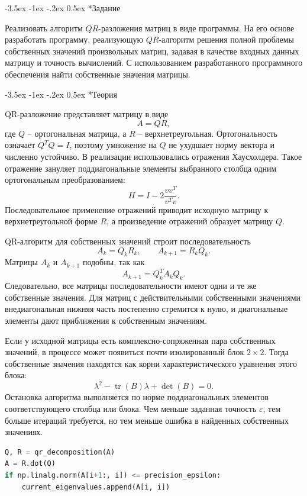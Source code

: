\documentclass[14pt, a4paper]{article}
\makeatletter
\renewcommand\section{\@startsection {section}{1}{\parindent}%
  {-3.5ex \@plus -1ex \@minus -.2ex}%
  {0.5ex}%
  {\normalfont\Large\bfseries}}
\makeatother
\begin{document}
\section*{Задание}
Реализовать алгоритм $QR$-разложения матриц в виде программы. На его основе разработать программу, реализующую $QR$-алгоритм решения полной проблемы собственных значений произвольных матриц, задавая в качестве входных данных матрицу и точность вычислений. С использованием разработанного программного обеспечения найти собственные значения матрицы.

\section*{Теория}
QR-разложение представляет матрицу в виде
\[
    A=QR,
\]
где $Q$ -- ортогональная матрица, а $R$ -- верхнетреугольная. Ортогональность означает $Q^TQ=I$, поэтому умножение на $Q$ не ухудшает норму вектора и численно устойчиво. В реализации использовались отражения Хаусхолдера. Такое отражение зануляет поддиагональные элементы выбранного столбца одним ортогональным преобразованием:
\[
    H=I-2\frac{vv^T}{v^Tv}.
\]
Последовательное применение отражений приводит исходную матрицу к верхнетреугольной форме $R$, а произведение отражений образует матрицу $Q$.

QR-алгоритм для собственных значений строит последовательность
\[
    A_k = Q_kR_k, \qquad A_{k+1}=R_kQ_k.
\]
Матрицы $A_k$ и $A_{k+1}$ подобны, так как
\[
    A_{k+1}=Q_k^TA_kQ_k.
\]
Следовательно, все матрицы последовательности имеют одни и те же собственные значения. Для матриц с действительными собственными значениями внедиагональная нижняя часть постепенно стремится к нулю, и диагональные элементы дают приближения к собственным значениям.

Если у исходной матрицы есть комплексно-сопряженная пара собственных значений, в процессе может появиться почти изолированный блок $2\times2$. Тогда собственные значения находятся как корни характеристического уравнения этого блока:
\[
    \lambda^2-\operatorname{tr}(B)\lambda+\det(B)=0.
\]
Остановка алгоритма выполняется по норме поддиагональных элементов соответствующего столбца или блока. Чем меньше заданная точность $\varepsilon$, тем больше итераций требуется, но тем меньше ошибка в найденных собственных значениях.

\begin{lstlisting}[language=Python]
Q, R = qr_decomposition(A)
A = R.dot(Q)
if np.linalg.norm(A[i+1:, i]) <= precision_epsilon:
    current_eigenvalues.append(A[i, i])
\end{lstlisting}
\end{document}
